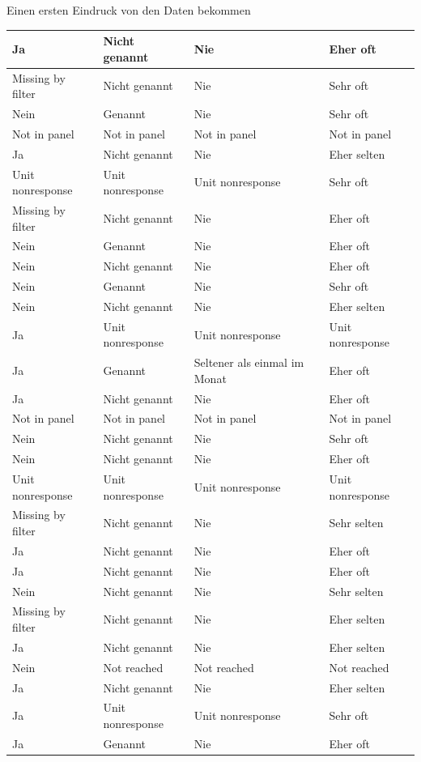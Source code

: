 \documentclass[ignorenonframetext,]{beamer}
\begin{document}
\begin{frame}{Einen ersten Eindruck von den Daten bekommen}
\begin{tabular}{l|l|l|l}
Ja & Nicht genannt & Nie & Eher oft\\
\hline
Missing by filter & Nicht genannt & Nie & Sehr oft\\
\hline
Nein & Genannt & Nie & Sehr oft\\
\hline
Not in panel & Not in panel & Not in panel & Not in panel\\
\hline
Ja & Nicht genannt & Nie & Eher selten\\
\hline
Unit nonresponse & Unit nonresponse & Unit nonresponse & Sehr oft\\
\hline
Missing by filter & Nicht genannt & Nie & Eher oft\\
\hline
Nein & Genannt & Nie & Eher oft\\
\hline
Nein & Nicht genannt & Nie & Eher oft\\
\hline
Nein & Genannt & Nie & Sehr oft\\
\hline
Nein & Nicht genannt & Nie & Eher selten\\
\hline
Ja & Unit nonresponse & Unit nonresponse & Unit nonresponse\\
\hline
Ja & Genannt & Seltener als einmal im Monat & Eher oft\\
\hline
Ja & Nicht genannt & Nie & Eher oft\\
\hline
Not in panel & Not in panel & Not in panel & Not in panel\\
\hline
Nein & Nicht genannt & Nie & Sehr oft\\
\hline
Nein & Nicht genannt & Nie & Eher oft\\
\hline
Unit nonresponse & Unit nonresponse & Unit nonresponse & Unit nonresponse\\
\hline
Missing by filter & Nicht genannt & Nie & Sehr selten\\
\hline
Ja & Nicht genannt & Nie & Eher oft\\
\hline
Ja & Nicht genannt & Nie & Eher oft\\
\hline
Nein & Nicht genannt & Nie & Sehr selten\\
\hline
Missing by filter & Nicht genannt & Nie & Eher selten\\
\hline
Ja & Nicht genannt & Nie & Eher selten\\
\hline
Nein & Not reached & Not reached & Not reached\\
\hline
Ja & Nicht genannt & Nie & Eher selten\\
\hline
Ja & Unit nonresponse & Unit nonresponse & Sehr oft\\
\hline
Ja & Genannt & Nie & Eher oft\\

\end{tabular}
\end{frame}
\end{document}

